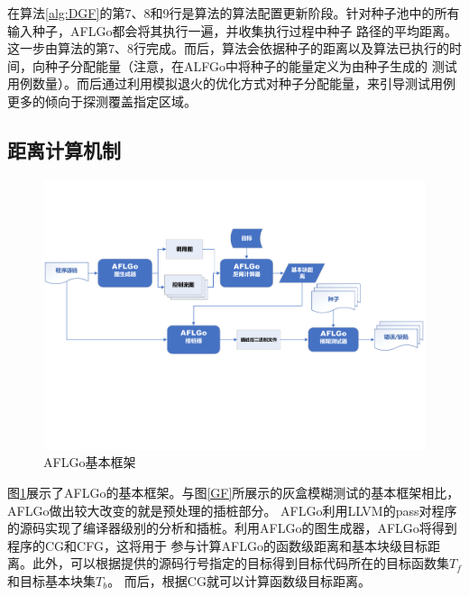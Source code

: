 \documentclass[bachelor]{njupthesis}
\begin{document}
在算法\ref{alg:DGF}的第7、8和9行是算法的算法配置更新阶段。针对种子池中的所有输入种子，AFLGo都会将其执行一遍，并收集执行过程中种子 路径的平均距离。
这一步由算法的第7、8行完成。而后，算法会依据种子的距离以及算法已执行的时间，向种子分配能量（注意，在ALFGo中将种子的能量定义为由种子生成的
测试用例数量）。而后通过利用模拟退火的优化方式对种子分配能量，来引导测试用例更多的倾向于探测覆盖指定区域。

\subsection{距离计算机制}
\begin{figure}[htbp]
	\centering
	\includegraphics[width=1\textwidth]{pic/AFLGo.pdf}
	\caption{AFLGo基本框架}
 	\label{pic:AFLGo}
\end{figure}

图\ref{pic:AFLGo}展示了AFLGo的基本框架。与图\ref{GF}所展示的灰盒模糊测试的基本框架相比，AFLGo做出较大改变的就是预处理的插桩部分。
AFLGo利用LLVM的pass\cite{Pass}对程序的源码实现了编译器级别的分析和插桩。利用AFLGo的图生成器，AFLGo将得到程序的CG和CFG，这将用于
参与计算AFLGo的函数级距离和基本块级目标距离。此外，可以根据提供的源码行号指定的目标得到目标代码所在的目标函数集$T_f$和目标基本块集$T_b$。
而后，根据CG就可以计算函数级目标距离。
\end{document}
